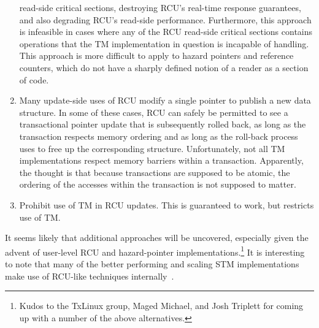 \begin{enumerate}
	read-side critical sections, destroying RCU's real-time response
	guarantees, and also degrading RCU's read-side performance.
	Furthermore, this approach is infeasible in cases where any of
	the RCU read-side critical sections contains operations that
	the TM implementation in question is incapable of handling.
	This approach is more difficult to apply to hazard pointers and
	reference counters, which do not have a sharply defined notion
	of a reader as a section of code.
\item	Many update-side uses of RCU modify a single pointer to publish
	a new data structure.
	In some of these cases, RCU can safely be permitted to see a
	transactional pointer update that is subsequently rolled back,
	as long as the transaction respects memory ordering and as long
	as the roll-back process uses  to free up the
	corresponding structure.
	Unfortunately, not all TM implementations respect memory barriers
	within a transaction.
	Apparently, the thought is that because transactions are supposed
	to be atomic, the ordering of the accesses within the transaction
	is not supposed to matter.
\item	Prohibit use of TM in RCU updates.
	This is guaranteed to work, but restricts use of TM.
\end{enumerate}

It seems likely that additional approaches will be uncovered, especially
given the advent of user-level RCU and hazard-pointer
implementations.\footnote{
	Kudos to the TxLinux group, Maged Michael, and Josh Triplett
	for coming up with a number of the above alternatives.}
It is interesting to note that many of the better performing and
scaling STM implementations make use of RCU-like techniques
internally~\cite{UCAM-CL-TR-579,KeirFraser2007withoutLocks,Gu:2019:PSE:3358807.3358885,Kim:2019:MSR:3297858.3304040}.

